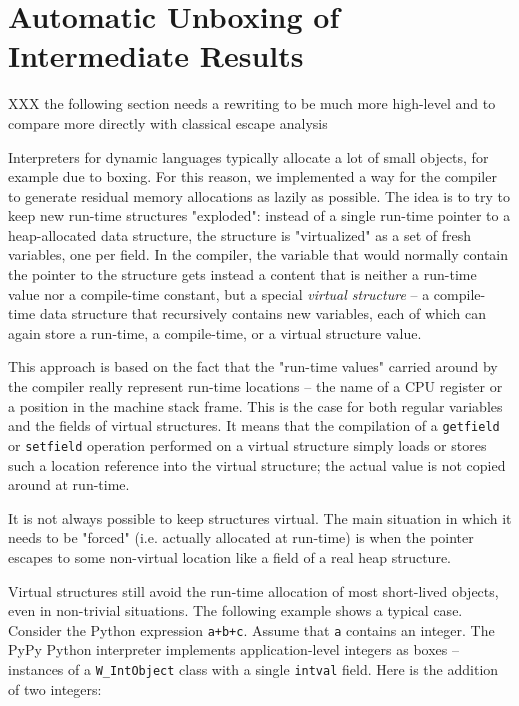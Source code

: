 \section{Automatic Unboxing of Intermediate Results}

XXX the following section needs a rewriting to be much more high-level and to
compare more directly with classical escape analysis

Interpreters for dynamic languages typically allocate a lot of small
objects, for example due to boxing.  For this reason, we
implemented a way for the compiler to generate residual memory
allocations as lazily as possible.  The idea is to try to keep new
run-time structures "exploded": instead of a single run-time pointer to
a heap-allocated data structure, the structure is "virtualized" as a set
of fresh variables, one per field.  In the compiler, the variable that
would normally contain the pointer to the structure gets instead a
content that is neither a run-time value nor a compile-time constant,
but a special \emph{virtual structure} – a compile-time data structure that
recursively contains new variables, each of which can again store a
run-time, a compile-time, or a virtual structure value.

This approach is based on the fact that the "run-time values" carried
around by the compiler really represent run-time locations – the name of
a CPU register or a position in the machine stack frame.  This is the
case for both regular variables and the fields of virtual structures.
It means that the compilation of a \texttt{getfield} or \texttt{setfield}
operation performed on a virtual structure simply loads or stores such a
location reference into the virtual structure; the actual value is not
copied around at run-time.

It is not always possible to keep structures virtual.  The main
situation in which it needs to be "forced" (i.e. actually allocated at
run-time) is when the pointer escapes to some non-virtual location like
a field of a real heap structure.

Virtual structures still avoid the run-time allocation of most
short-lived objects, even in non-trivial situations.  The following
example shows a typical case.  Consider the Python expression \texttt{a+b+c}.
Assume that \texttt{a} contains an integer.  The PyPy Python interpreter
implements application-level integers as boxes – instances of a
\texttt{W\_IntObject} class with a single \texttt{intval} field.  Here is the
addition of two integers:

